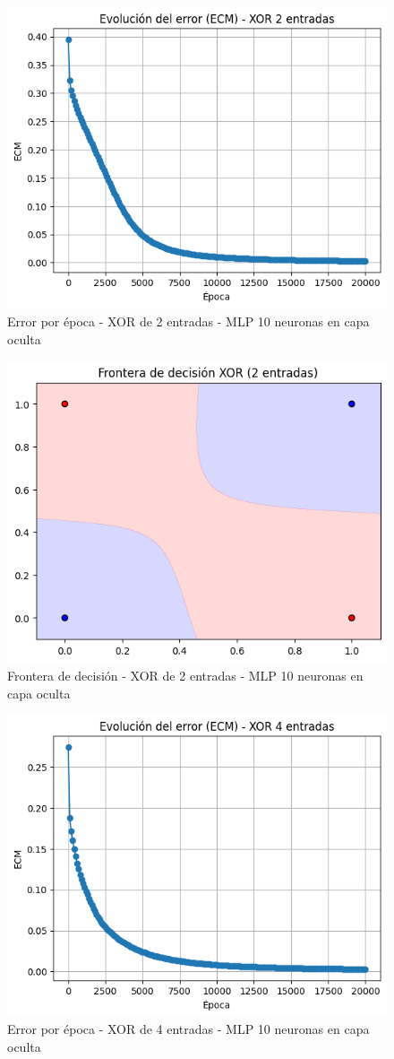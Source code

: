 \documentclass[11pt]{article} %
\begin{document}
\begin{figure}[htbp!]
	\centering
	\includegraphics[width=0.7\linewidth]{../imgs/ej3/10neur/2ecm}
	\caption{Error por época - XOR de 2 entradas - MLP 10 neuronas en capa oculta}
	\label{fig:2ecm}
\end{figure}

\begin{figure}[htbp!]
	\centering
	\includegraphics[width=0.7\linewidth]{../imgs/ej3/10neur/front}
	\caption{Frontera de decisión - XOR de 2 entradas - MLP 10 neuronas en capa oculta}
	\label{fig:front}
\end{figure}

\begin{figure}[htbp!]
	\centering
	\includegraphics[width=0.7\linewidth]{../imgs/ej3/10neur/4ecm}
	\caption{Error por época - XOR de 4 entradas - MLP 10 neuronas en capa oculta}
	\label{fig:4ecm}
\end{figure}
\end{document}
